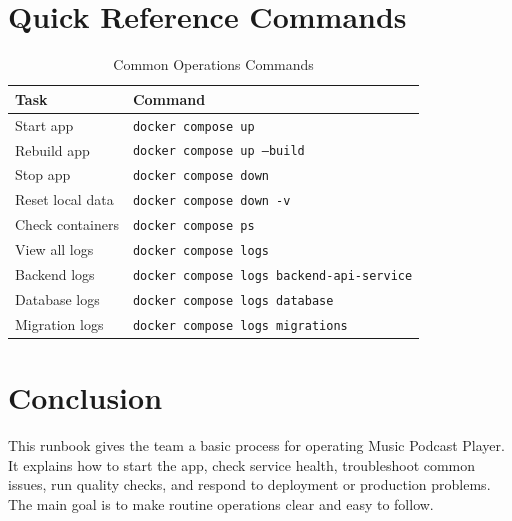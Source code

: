 \documentclass{article}
\begin{document}
\section{Quick Reference Commands}
\begin{table}[H]
    \centering
    \begin{tabular}{l l}
        \toprule
        Task & Command \\
        \midrule
        Start app & \texttt{docker compose up} \\
        Rebuild app & \texttt{docker compose up --build} \\
        Stop app & \texttt{docker compose down} \\
        Reset local data & \texttt{docker compose down -v} \\
        Check containers & \texttt{docker compose ps} \\
        View all logs & \texttt{docker compose logs} \\
        Backend logs & \texttt{docker compose logs backend-api-service} \\
        Database logs & \texttt{docker compose logs database} \\
        Migration logs & \texttt{docker compose logs migrations} \\
        \bottomrule
    \end{tabular}
    \caption{Common Operations Commands}
    \label{tab:quick-commands}
\end{table}

\section{Conclusion}
This runbook gives the team a basic process for operating Music Podcast Player. It explains how to start the app, check service health, troubleshoot common issues, run quality checks, and respond to deployment or production problems. The main goal is to make routine operations clear and easy to follow.
\end{document}

